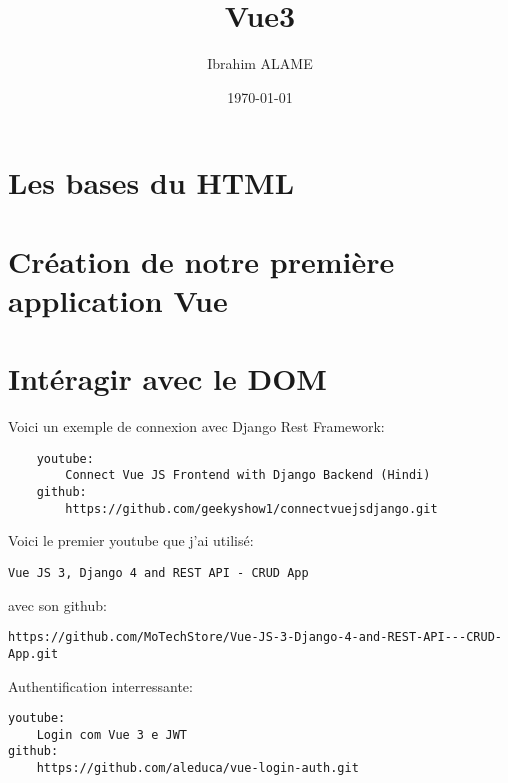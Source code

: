 \documentclass[a4paper]{book}
\title{Vue3}
\author{Ibrahim ALAME}
\date{\today}
\begin{document}
 
\maketitle

    \chapter{Les bases du HTML}
	

    \chapter{Création de notre première application Vue}
    
	\chapter{Intéragir avec le DOM}
		
	
	Voici un exemple de connexion avec Django Rest Framework:
	\begin{verbatim}
	youtube:
		Connect Vue JS Frontend with Django Backend (Hindi)
	github:
		https://github.com/geekyshow1/connectvuejsdjango.git
\end{verbatim}
Voici le premier youtube que j'ai utilisé:
\begin{verbatim}
Vue JS 3, Django 4 and REST API - CRUD App
\end{verbatim}
avec son github:
\begin{verbatim}
https://github.com/MoTechStore/Vue-JS-3-Django-4-and-REST-API---CRUD-App.git
\end{verbatim}
Authentification interressante:
\begin{verbatim}
youtube:
	Login com Vue 3 e JWT
github:
	https://github.com/aleduca/vue-login-auth.git	
\end{verbatim}

    \tableofcontents    

\end{document}
